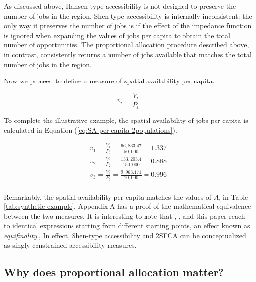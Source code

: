 \documentclass[]{elsarticle} %
\begin{document}
As discussed above, Hansen-type accessibility is not designed to
preserve the number of jobs in the region. Shen-type accessibility is
internally inconsistent: the only way it preserves the number of jobs is
if the effect of the impedance function is ignored when expanding the
values of jobs per capita to obtain the total number of opportunities.
The proportional allocation procedure described above, in contrast,
consistently returns a number of jobs available that matches the total
number of jobs in the region.

Now we proceed to define a measure of spatial availability per capita:

\begin{equation}
\label{eq:SA-per-capita}
v_i = \frac{V_i}{P_i}
\end{equation}

To complete the illustrative example, the spatial availability of jobs
per capita is calculated in Equation
(\ref{eq:SA-per-capita-2populations}).

\begin{equation}
\label{eq:SA-per-capita-2populations}
\begin{array}{l}
v_{1} = \frac{V_1}{P_1} =  \frac{66,833.47}{50,000} = 1.337\\
v_{2} =  \frac{V_{2}}{P_2} =  \frac{133,203.4}{150,000} = 0.888\\
v_{3} =  \frac{V_{3}}{P_3} =  \frac{9,963.171}{10,000} = 0.996\\
\end{array}
\end{equation}

Remarkably, the spatial availability per capita matches the values of
\(A_i\) in Table \ref{tab:synthetic-example}. Appendix A has a proof of
the mathematical equivalence between the two measures. It is interesting
to note that \citet{weibull_axiomatic_1976}, \citet{shen1998}, and this
paper reach to identical expressions starting from different starting
points, an effect known as \emph{equifinality}
\citetext{\citealp[see][p.~333]{ortuzar_2011_modelling}; \citealp{williams_hall_1981}},
In effect, Shen-type accessibility and 2SFCA can be conceptualized as
singly-constrained accessibility measures.

\hypertarget{why-does-proportional-allocation-matter}{%
\subsection{Why does proportional allocation
matter?}\label{why-does-proportional-allocation-matter}}
\end{document}
